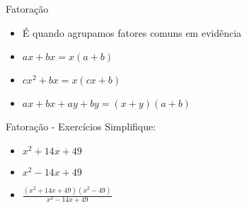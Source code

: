 \begin{frame}
	\begin{block}{Fatoração}
		\begin{itemize}
			\item É quando agrupamos fatores comuns em evidência
			\item $ax + bx = x(a+b)$
			\item $cx^{2} + bx = x(cx+b)$
			\item $ax + bx + ay + by= (x+y)(a+b)$
		\end{itemize}
	\end{block}
\end{frame}

\begin{frame}
	\begin{block}{Fatoração - Exercícios}
		Simplifique:
		\begin{itemize}
			\item $x^{2} +14x+49$
			\item $x^{2} -14x+49$
			\item $\frac{(x^{2} +14x+49)(x^{2} - 49)}{x^{2} -14x+49}$
		\end{itemize}
	\end{block}
\end{frame}